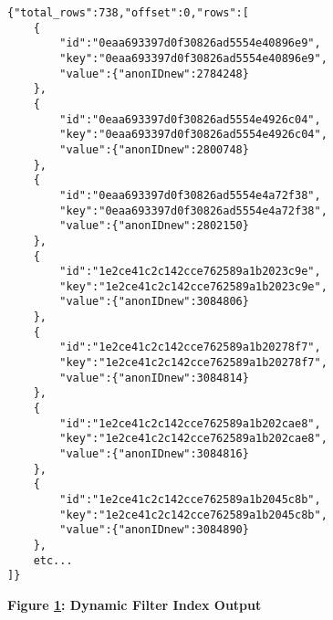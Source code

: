 \begin{figure}[H]
    \centering
    \begin{mdframed}
        \centering
        \begin{verbatim}
{"total_rows":738,"offset":0,"rows":[
    {
        "id":"0eaa693397d0f30826ad5554e40896e9",
        "key":"0eaa693397d0f30826ad5554e40896e9",
        "value":{"anonIDnew":2784248}
    },
    {
        "id":"0eaa693397d0f30826ad5554e4926c04",
        "key":"0eaa693397d0f30826ad5554e4926c04",
        "value":{"anonIDnew":2800748}
    },
    {
        "id":"0eaa693397d0f30826ad5554e4a72f38",
        "key":"0eaa693397d0f30826ad5554e4a72f38",
        "value":{"anonIDnew":2802150}
    },
    {
        "id":"1e2ce41c2c142cce762589a1b2023c9e",
        "key":"1e2ce41c2c142cce762589a1b2023c9e",
        "value":{"anonIDnew":3084806}
    },
    {
        "id":"1e2ce41c2c142cce762589a1b20278f7",
        "key":"1e2ce41c2c142cce762589a1b20278f7",
        "value":{"anonIDnew":3084814}
    },
    {
        "id":"1e2ce41c2c142cce762589a1b202cae8",
        "key":"1e2ce41c2c142cce762589a1b202cae8",
        "value":{"anonIDnew":3084816}
    },
    {
        "id":"1e2ce41c2c142cce762589a1b2045c8b",
        "key":"1e2ce41c2c142cce762589a1b2045c8b",
        "value":{"anonIDnew":3084890}
    },
    etc...
]}        
        \end{verbatim}
    \end{mdframed}
    \caption[Dynamic Filter Index Output]{\textbf{Figure \ref{fig-dynamic-filter-example}: Dynamic Filter Index Output}}
    \label{fig-dynamic-filter-example}
\end{figure}
